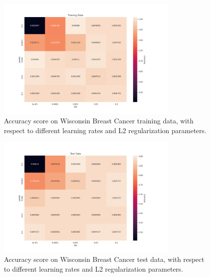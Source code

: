 \begin{figure}[H]
    \centering
    \includegraphics[width=0.8\textwidth]{Figures/PartE/e_heatmap_train_lambd_vs_eta_gamma_0_9_epochs_200.png}
    \caption{Accuracy score on Wisconsin Breast Cancer training data, with
    respect to different learning rates and L2 regularization parameters.}  
    \label{fig:e_heatmap_train_lambd_vs_eta_gamma_0_9_epochs_200} 
\end{figure}


\begin{figure}[H]
    \centering
    \includegraphics[width=0.8\textwidth]{Figures/PartE/e_heatmap_test_lambd_vs_eta_gamma_0_9_epochs_200.png}
    \caption{Accuracy score on Wisconsin Breast Cancer test data, with
    respect to different learning rates and L2 regularization parameters.}  
    \label{fig:e_heatmap_train_lambd_vs_eta_gamma_0_9_epochs_200} 
\end{figure}





